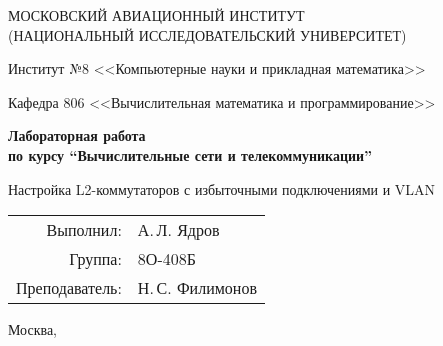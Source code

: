 \begin{titlepage}
\begin{center}
\large
МОСКОВСКИЙ АВИАЦИОННЫЙ ИНСТИТУТ\\ (НАЦИОНАЛЬНЫЙ ИССЛЕДОВАТЕЛЬСКИЙ УНИВЕРСИТЕТ)

\vspace{20pt}

Институт №8 <<Компьютерные науки и прикладная математика>>

Кафедра 806 <<Вычислительная математика и программирование>>
\end{center}

\vspace{60pt}

\begin{center}
\bfseries
\large
Лабораторная работа  \\по курсу \enquote{Вычислительные сети и телекоммуникации}

\vspace{54pt}

Настройка L2-коммутаторов с избыточными подключениями и VLAN

\end{center}

\vfill

\begin{flushright}
\large
\begin{tabular}{rl}
Выполнил: & А.\,Л. Ядров \\
Группа: & 8О-408Б \\
Преподаватель: & Н.\,С. Филимонов \\
\end{tabular}
\end{flushright}

\vspace{92pt}

\begin{center}
\large
Москва, \the\year
\end{center}
\end{titlepage}

\pagebreak
